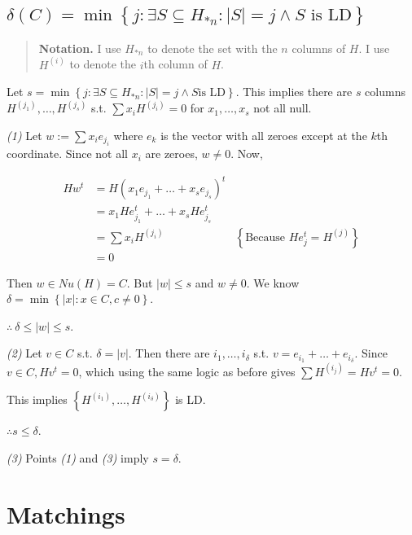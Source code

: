 \documentclass[a4paper, 12pt]{article}
\begin{document}
\pagebreak


\subsection{$\delta(C) = \min \left\{ j : \exists S \subseteq H_{*n} : |S| = j \land  S \text{ is LD} \right\} $}

\begin{quote}
    \textbf{Notation.} I use $H_{*n}$ to denote the set with the $n$ columns
    of $H$. I use $H^{(i)}$ to denote the $i$th column of $H$.
\end{quote}

Let $s = \min \left\{ j : \exists S \subseteq H_{*n} : |S| = j \land  S \text{
is LD} \right\} $. This implies there are $s$ columns $H^{(j_1)}, \ldots,
H^{(j_s)}$ s.t. $\sum x_i H^{( j_i )} = 0$ for $x_1, \ldots, x_s$ not all null.

\textit{(1)} Let $w := \sum x_i e_{j_i}$ where $e_{k}$ is the vector with all
zeroes except at the $k$th coordinate. Since not all $x_i$ are zeroes, $w \neq
0$. Now, 

\begin{align*}
    Hw^t &= H \left( x_1 e_{j_1} + \ldots + x_s e_{j_s} \right)^t \\ 
         &= x_1 H e_{j_1}^t + \ldots + x_s H e_{j_s}^t \\ 
         &= \sum x_i H^{(j_i)} &\left\{ \text{Because } He_j^t = H^{(j)} \right\}  \\ 
         &= 0
\end{align*}

Then $w \in Nu(H) = C$. But $|w| \leq s$ and $w \neq 0$. We know $\delta = \min
\left\{ |x| : x \in C, c \neq 0 \right\} $.

$\therefore ~ \delta \leq |w| \leq s$.

\textit{(2)} Let $v \in  C$ s.t. $\delta = |v|$. Then there are 
$i_1, \ldots, i_{\delta}$ s.t. $v = e_{i_1} + \ldots + e_{i_\delta}$.
Since $v \in  C, Hv^t = 0$, which using the same 
logic as before gives $\sum H^{(i_j)} = Hv^t = 0$.

This implies $\left\{ H^{(i_1)}, \ldots, H^{(i_{\delta})} \right\} $ is LD.

$\therefore  s \leq \delta$.

\textit{(3)} Points \textit{(1)} and \textit{(3)} imply $s = \delta$.





\pagebreak

\section{Matchings}
\end{document}
